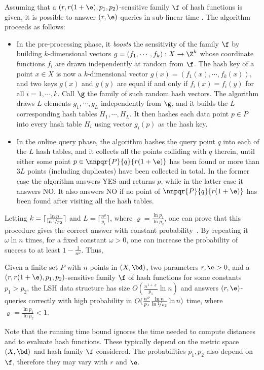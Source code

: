 Assuming that a $(r, r(1+\e), p_1, p_2)$-sensitive family $\f$ of hash
functions is given, it is possible to answer $(r,\e)$-\pleb queries in
sub-linear time \citep{GIM99,IM98}. The algorithm proceeds as follows:
\begin{itemize}
\item In the pre-processing phase, it {\em boosts} the sensitivity of
  the family $\f$ by building $k$-dimensional vectors $g=(f_1, \cdots,
  f_k): X\to \Z^k$ whose coordinate functions $f_i$ are drawn
  independently at random from $\f$. The hash key of a point $x\in X$
  is now a $k$-dimensional vector $g(x)=(f_1(x), \cdots, f_k(x))$, and
  two keys $g(x)$ and $g(y)$ are equal if and only if
  $f_i(x)=f_i(y)$ for all $i=1, \cdots, k$. Call $\g$ the family of
  such random hash vectors. The algorithm draws $L$ elements $g_1,
  \cdots, g_L$ independently from $\g$, and it builds the $L$
  corresponding hash tables $H_1, \cdots, H_L$. It then hashes each
  data point $p\in P$ into every hash table $H_i$ using vector
  $g_i(p)$ as the hash key.

\item In the online query phase, the algorithm hashes the query point
  $q$ into each of the $L$ hash tables, and it collects all the
  points colliding with $q$ therein, until either some point $p\in
  \nnpqr{P}{q}{r(1+\e)}$ has been found or more than $3L$ points
  (including duplicates) have been collected in total. In the former
  case the algorithm answers YES and returns $p$, while in the latter
  case it answers NO. It also answers NO if no point of
  $\nnpqr{P}{q}{r(1+\e)}$ has been found after visiting all the hash
  tables.
\end{itemize}

Letting $k=\lceil\frac{\ln n}{\ln \nicefrac{1}{p_2}}\rceil$ and
$L=\lceil \frac{n^\varrho}{p_1}\rceil$, where $\varrho=\frac{\ln p_1}{\ln p_2}$,
one can prove that this procedure gives the correct answer with
constant probability~\cite{GIM99,IM98}. By repeating it $\omega\ln n$
times, for a fixed constant $\omega> 0$, one can increase the probability of
success to at least $1-\frac{1}{n^\omega}$.  Thus,
\begin{thm}\label{th:lsh4renn}
  Given a finite set $P$ with $n$ points in $(X, \bd)$, two parameters
  $r,\e> 0$, and a $(r,r(1+\e),p_1,p_2)$-sensitive family $\f$ of hash
  functions for some constants $p_1>p_2$, the LSH data structure has
  size $O(\frac{n^{1+\varrho}}{p_1}\ln n)$ and answers $(r,\e)$-\pleb
  queries correctly with high probability in
  $O(\frac{n^\varrho}{p_1}\frac{\ln n}{\ln\nicefrac{1}{p_2}}\ln n)$
  time, where $\varrho = \frac{\ln p_1}{\ln p_2}<1$.
\end{thm}
Note that the running time bound ignores the time needed to compute
distances and to evaluate hash functions. These typically depend on
the metric space $(X,\bd)$ and hash family $\f$ considered.
The probabilities $p_1,p_2$ also depend on
$\f$, therefore they may vary with $r$ and $\e$.

